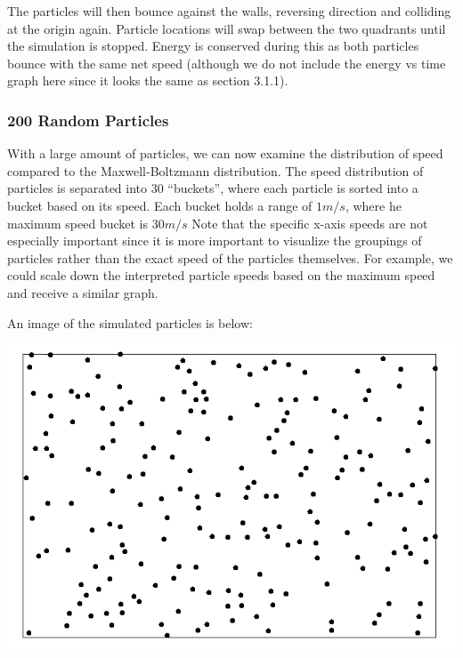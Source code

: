 \documentclass{article}
\begin{document}
The particles will then bounce against the walls, reversing direction and colliding at the origin again.
Particle locations will swap between the two quadrants until the simulation is stopped.
Energy is conserved during this as both particles bounce with the same net speed
(although we do not include the energy vs time graph here since it looks the same as section 3.1.1).

\subsubsection{200 Random Particles}
With a large amount of particles, we can now examine the distribution of speed compared to the Maxwell-Boltzmann distribution.
The speed distribution of particles is separated into 30 ``buckets'',
where each particle is sorted into a bucket based on its speed.
Each bucket holds a range of $1m/s$, where he maximum speed bucket is $30 m/s$
Note that the specific x-axis speeds are not especially important
since it is more important to visualize the groupings of particles rather than the exact speed of the particles themselves.
For example, we could scale down the interpreted particle speeds based on the maximum speed and receive a similar graph.

An image of the simulated particles is below:
\\
\begin{center}
    \includegraphics[scale=0.5]{uncharged_random}
\end{center}
\end{document}
